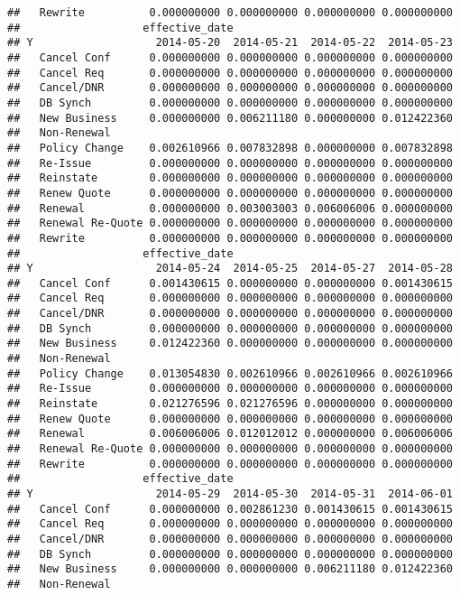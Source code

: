 \documentclass[]{article}
\begin{document}
\begin{verbatim}
##   Rewrite          0.000000000 0.000000000 0.000000000 0.000000000
##                   effective_date
## Y                   2014-05-20  2014-05-21  2014-05-22  2014-05-23
##   Cancel Conf      0.000000000 0.000000000 0.000000000 0.000000000
##   Cancel Req       0.000000000 0.000000000 0.000000000 0.000000000
##   Cancel/DNR       0.000000000 0.000000000 0.000000000 0.000000000
##   DB Synch         0.000000000 0.000000000 0.000000000 0.000000000
##   New Business     0.000000000 0.006211180 0.000000000 0.012422360
##   Non-Renewal                                                     
##   Policy Change    0.002610966 0.007832898 0.000000000 0.007832898
##   Re-Issue         0.000000000 0.000000000 0.000000000 0.000000000
##   Reinstate        0.000000000 0.000000000 0.000000000 0.000000000
##   Renew Quote      0.000000000 0.000000000 0.000000000 0.000000000
##   Renewal          0.000000000 0.003003003 0.006006006 0.000000000
##   Renewal Re-Quote 0.000000000 0.000000000 0.000000000 0.000000000
##   Rewrite          0.000000000 0.000000000 0.000000000 0.000000000
##                   effective_date
## Y                   2014-05-24  2014-05-25  2014-05-27  2014-05-28
##   Cancel Conf      0.001430615 0.000000000 0.000000000 0.001430615
##   Cancel Req       0.000000000 0.000000000 0.000000000 0.000000000
##   Cancel/DNR       0.000000000 0.000000000 0.000000000 0.000000000
##   DB Synch         0.000000000 0.000000000 0.000000000 0.000000000
##   New Business     0.012422360 0.000000000 0.000000000 0.000000000
##   Non-Renewal                                                     
##   Policy Change    0.013054830 0.002610966 0.002610966 0.002610966
##   Re-Issue         0.000000000 0.000000000 0.000000000 0.000000000
##   Reinstate        0.021276596 0.021276596 0.000000000 0.000000000
##   Renew Quote      0.000000000 0.000000000 0.000000000 0.000000000
##   Renewal          0.006006006 0.012012012 0.000000000 0.006006006
##   Renewal Re-Quote 0.000000000 0.000000000 0.000000000 0.000000000
##   Rewrite          0.000000000 0.000000000 0.000000000 0.000000000
##                   effective_date
## Y                   2014-05-29  2014-05-30  2014-05-31  2014-06-01
##   Cancel Conf      0.000000000 0.002861230 0.001430615 0.001430615
##   Cancel Req       0.000000000 0.000000000 0.000000000 0.000000000
##   Cancel/DNR       0.000000000 0.000000000 0.000000000 0.000000000
##   DB Synch         0.000000000 0.000000000 0.000000000 0.000000000
##   New Business     0.000000000 0.000000000 0.006211180 0.012422360
##   Non-Renewal                                                     

\end{verbatim}
\end{document}
